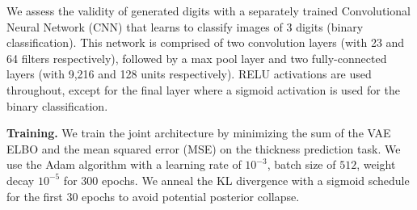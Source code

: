 \begin{table}[h]
\begin{center}
\caption{\textbf{Digit generation - Model architecture details}}
\label{Appendix_B_Table_model}
\end{center}
\end{table}

We assess the validity of generated digits with a separately trained Convolutional Neural Network (CNN) that learns to classify images of 3 digits (binary classification). This network is comprised of two convolution layers (with 23 and 64 filters respectively), followed by a max pool layer and two fully-connected layers (with 9,216 and 128 units respectively). RELU activations are used throughout, except for the final layer where a sigmoid activation is used for the binary classification.

\textbf{Training.} We train the joint architecture by minimizing the sum of the VAE ELBO and the mean squared error (MSE) on the thickness prediction task.
We use the Adam algorithm \citep{kingma2017adam} with a learning rate of $10^{-3}$, batch size of $512$, weight decay $10^{-5}$ for 300 epochs. We anneal the KL divergence with a sigmoid schedule for the first 30 epochs to avoid potential posterior collapse.

